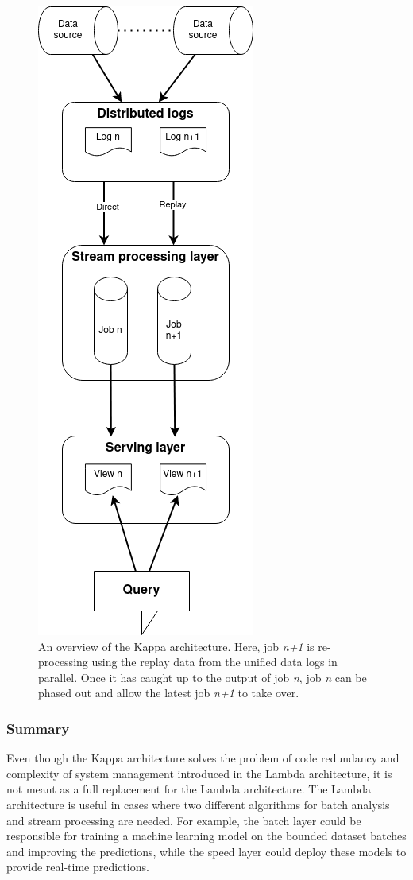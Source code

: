 \begin{figure}[!htbp]
    \centering
    \includegraphics[width=0.4\linewidth]{fig/kappa_arch.png}
    \caption{An overview of the Kappa architecture. Here, job \emph{n+1} is re-processing using the replay 
    data from the unified data logs in parallel. Once it has caught up to the output of job \emph{n}, 
    job \emph{n} can be phased out and allow the latest job \emph{n+1} to take over.}
    \label{fig:kappa_arch}
\end{figure}


\subsubsection{Summary}%
Even though the Kappa architecture solves the problem of code redundancy and complexity of 
system management introduced in the 
Lambda architecture, it is not meant as a full replacement for the Lambda architecture. 
The Lambda architecture is useful in cases where two different algorithms for 
batch analysis and stream processing are needed. For example, the batch layer could be responsible for training 
a machine learning model on the bounded dataset batches and improving the 
predictions, while the speed layer could deploy these models to provide real-time predictions. 


